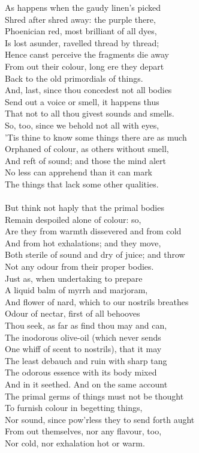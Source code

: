 As happens when the gaudy linen's picked\\
Shred after shred away: the purple there,\\
Phoenician red, most brilliant of all dyes,\\
Is lost asunder, ravelled thread by thread;\\
Hence canst perceive the fragments die away\\
From out their colour, long ere they depart\\
Back to the old primordials of things.\\
And, last, since thou concedest not all bodies\\
Send out a voice or smell, it happens thus\\
That not to all thou givest sounds and smells.\\
So, too, since we behold not all with eyes,\\
'Tis thine to know some things there are as much\\
Orphaned of colour, as others without smell,\\
And reft of sound; and those the mind alert\\
No less can apprehend than it can mark\\
The things that lack some other qualities.\\
\\
But think not haply that the primal bodies\\
Remain despoiled alone of colour: so,\\
Are they from warmth dissevered and from cold\\
And from hot exhalations; and they move,\\
Both sterile of sound and dry of juice; and throw\\
Not any odour from their proper bodies.\\
Just as, when undertaking to prepare\\
A liquid balm of myrrh and marjoram,\\
And flower of nard, which to our nostrils breathes\\
Odour of nectar, first of all behooves\\
Thou seek, as far as find thou may and can,\\
The inodorous olive-oil (which never sends\\
One whiff of scent to nostrils), that it may\\
The least debauch and ruin with sharp tang\\
The odorous essence with its body mixed\\
And in it seethed. And on the same account\\
The primal germs of things must not be thought\\
To furnish colour in begetting things,\\
Nor sound, since pow'rless they to send forth aught\\
From out themselves, nor any flavour, too,\\
Nor cold, nor exhalation hot or warm.

